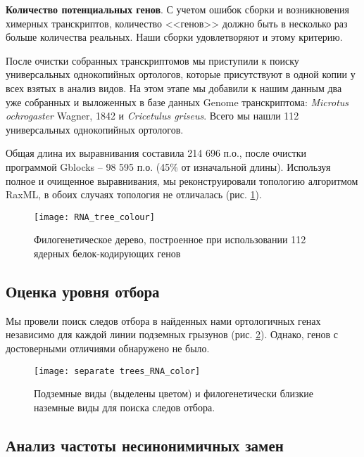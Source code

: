 \textbf{Количество потенциальных генов}. С учетом ошибок сборки и возникновения химерных транскриптов, количество <<генов>> должно быть в несколько раз больше количества реальных. Наши сборки удовлетворяют и этому критерию.  

После очистки собранных транскриптомов мы приступили к поиску универсальных однокопийных ортологов, которые присутствуют в одной копии у всех взятых в анализ видов. На этом этапе мы добавили к нашим данным два уже собранных и выложенных в базе данных Genome транскриптома: \textit{Microtus ochrogaster} Wagner, 1842 и \textit{Cricetulus griseus}. Всего мы нашли 112 универсальных однокопийных ортологов.

Общая длина их выравнивания составила 214 696 п.о., после очистки программой Gblocks -- 98 595 п.о. (45\% от изначальной длины). Используя полное и очищенное выравнивания, мы реконструировали топологию алгоритмом RaxML, в обоих случаях топология не отличалась (рис. \ref{tree_RNA}).

\begin{figure}[h!]
	\begin{center}
		\texttt{[image: RNA\_tree\_colour]}
	\end{center}
	\caption{Филогенетическое дерево, построенное при использовании 112 ядерных белок-кодирующих генов}\label{tree_RNA}
\end{figure}

\subsection{Оценка уровня отбора} 


Мы провели поиск следов отбора в найденных нами ортологичных генах независимо для каждой линии подземных грызунов (рис. \ref{RNA_trees_sep}). Однако, генов с достоверными отличиями обнаружено не было. 

\begin{figure}[h!]
	\begin{center}
		\texttt{[image: separate trees\_RNA\_color]}
	\end{center}
	\caption{Подземные виды (выделены цветом) и филогенетически близкие наземные виды для поиска следов отбора. }\label{RNA_trees_sep}
\end{figure}


\subsection{Анализ частоты несинонимичных замен}

